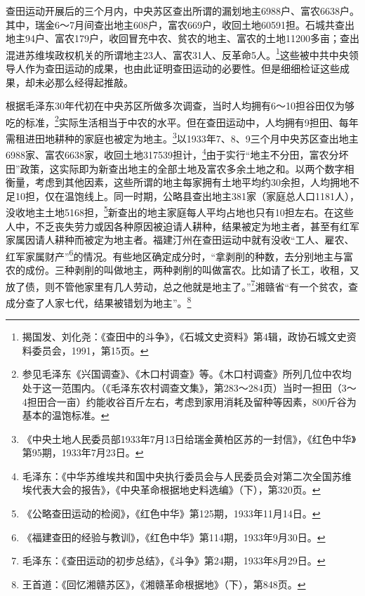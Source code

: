 查田运动开展后的三个月内，中央苏区查出所谓的漏划地主6988户、富农6638户。其中，瑞金6～7月间查出地主608户，富农669户，收回土地60591担。石城共查出地主94户、富农179户，收回冒充中农、贫农的地主、富农的土地11200多亩；查出混进苏维埃政权机关的所谓地主23人、富农31人、反革命5人。\footnote{揭国发、刘化尧：《查田中的斗争》，《石城文史资料》第4辑，政协石城文史资料委员会，1991，第15页。}这些被中共中央领导人作为查田运动的成果，也由此证明查田运动的必要性。但是细细检证这些成果，却未必那么经得起推敲。


根据毛泽东30年代初在中央苏区所做多次调查，当时人均拥有6～10担谷田仅为够吃的标准，\footnote{参见毛泽东《兴国调查》、《木口村调查》等。《木口村调查》所列几位中农均处于这一范围内。（《毛泽东农村调查文集》，第283～284页）当时一担田（3～4担田合一亩）约能收谷百斤左右，考虑到家用消耗及留种等因素，800斤谷为基本的温饱标准。}实际生活相当于中农的水平。但在查田运动中，人均拥有9担田、每年需租进田地耕种的家庭也被定为地主。\footnote{《中央土地人民委员部1933年7月13日给瑞金黄柏区苏的一封信》，《红色中华》第95期，1933年7月23日。}以1933年7、8、9三个月中央苏区查出地主6988家、富农6638家，收回土地317539担计，\footnote{毛泽东：《中华苏维埃共和国中央执行委员会与人民委员会对第二次全国苏维埃代表大会的报告》，《中央革命根据地史料选编》（下），第320页。}由于实行“地主不分田，富农分坏田”政策，这实际即为新查出地主的全部土地及富农多余土地之和。以两个数字相衡量，考虑到其他因素，这些所谓的地主每家拥有土地平均约30余担，人均拥地不足10担，仅在温饱线上。同一时期，公略县查出地主381家（家庭总人口1181人），没收地主土地5168担，\footnote{《公略查田运动的检阅》，《红色中华》第125期，1933年11月14日。}新查出的地主家庭每人平均占地也只有10担左右。在这些人中，不乏丧失劳力或因各种原因被迫请人耕种，结果被定为地主者，甚至有红军家属因请人耕种而被定为地主者。福建汀州在查田运动中就有没收“工人、雇农、红军家属财产”\footnote{《福建查田的经验与教训》，《红色中华》第114期，1933年9月30日。}的情况。有些地区确定成分时，“拿剥削的种数，去分别地主与富农的成份。三种剥削的叫做地主，两种剥削的叫做富农。比如请了长工，收租，又放了债，则不管他家里有几人劳动，总之他就是地主了。”\footnote{毛泽东：《查田运动的初步总结》，《斗争》第24期，1933年8月29日。}湘赣省“有一个贫农，查成分查了人家七代，结果被错划为地主”。\footnote{王首道：《回忆湘赣苏区》，《湘赣革命根据地》（下），第848页。}


